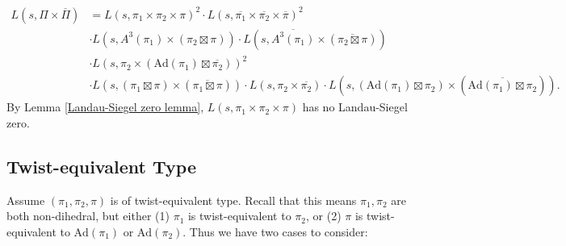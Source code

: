 \documentclass[12pt]{amsart}
\newcommand{\Ad}{\text{Ad}}
\newcommand{\ov}{\overline}
\begin{document}
\begin{align*}
    L(s,\Pi \times \ov{\Pi}) &= L(s,\pi_1 \times \pi_2 \times \pi)^2 \cdot L(s,\ov{\pi_1} \times \ov{\pi_2} \times \ov{\pi})^2 \\
    &\cdot L(s,A^3(\pi_1) \times (\pi_2 \boxtimes \pi)) \cdot L(s,\ov{A^3(\pi_1)} \times (\ov{\pi_2 \boxtimes \pi})) \\
    &\cdot L(s,\pi_2 \times (\Ad(\pi_1) \boxtimes \ov{\pi_2}))^2 \\
    &\cdot L(s,(\pi_1 \boxtimes \pi) \times (\ov{\pi_1 \boxtimes \pi})) \cdot L(s,\pi_2 \times \ov{\pi_2}) \cdot L(s,(\Ad(\pi_1) \boxtimes \pi_2) \times (\ov{\Ad(\pi_1) \boxtimes \pi_2})).
\end{align*}
By Lemma \ref{Landau-Siegel zero lemma}, $L(s,\pi_1 \times \pi_2 \times \pi)$ has no Landau-Siegel zero.

\subsection{Twist-equivalent Type}
Assume $(\pi_1,\pi_2,\pi)$ is of twist-equivalent type. Recall that this means $\pi_1,\pi_2$ are both non-dihedral, but either (1) $\pi_1$ is twist-equivalent to $\pi_2$, or (2) $\pi$ is twist-equivalent to $\Ad(\pi_1)$ or $\Ad(\pi_2)$. Thus we have two cases to consider:
\end{document}
